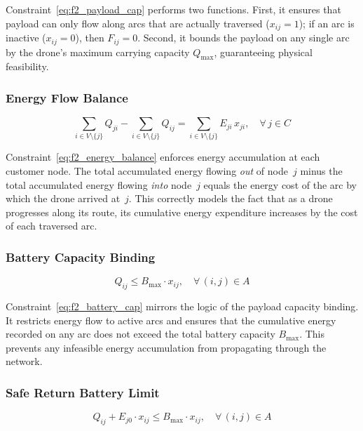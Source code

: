 \documentclass[11pt,a4paper]{article}
\begin{document}
Constraint~\eqref{eq:f2_payload_cap} performs two functions. First, it ensures that payload can only flow along arcs that are actually traversed ($x_{ij} = 1$); if an arc is inactive ($x_{ij} = 0$), then $F_{ij} = 0$. Second, it bounds the payload on any single arc by the drone's maximum carrying capacity $Q_{\max}$, guaranteeing physical feasibility.

\subsubsection{Energy Flow Balance}
\begin{equation}
  \sum_{i \in V \setminus \{j\}} Q_{ji} - \sum_{i \in V \setminus \{j\}} Q_{ij} = \sum_{i \in V \setminus \{j\}} E_{ji} \, x_{ji}, \quad \forall\, j \in C
  \label{eq:f2_energy_balance}
\end{equation}

Constraint~\eqref{eq:f2_energy_balance} enforces energy accumulation at each customer node. The total accumulated energy flowing \emph{out} of node~$j$ minus the total accumulated energy flowing \emph{into} node~$j$ equals the energy cost of the arc by which the drone arrived at~$j$. This correctly models the fact that as a drone progresses along its route, its cumulative energy expenditure increases by the cost of each traversed arc.

\subsubsection{Battery Capacity Binding}
\begin{equation}
  Q_{ij} \le B_{\max} \cdot x_{ij}, \quad \forall\, (i,j) \in A
  \label{eq:f2_battery_cap}
\end{equation}

Constraint~\eqref{eq:f2_battery_cap} mirrors the logic of the payload capacity binding. It restricts energy flow to active arcs and ensures that the cumulative energy recorded on any arc does not exceed the total battery capacity $B_{\max}$. This prevents any infeasible energy accumulation from propagating through the network.

\subsubsection{Safe Return Battery Limit}
\begin{equation}
  Q_{ij} + E_{j0} \cdot x_{ij} \le B_{\max} \cdot x_{ij}, \quad \forall\, (i,j) \in A
  \label{eq:f2_safe_return}
\end{equation}
\end{document}

